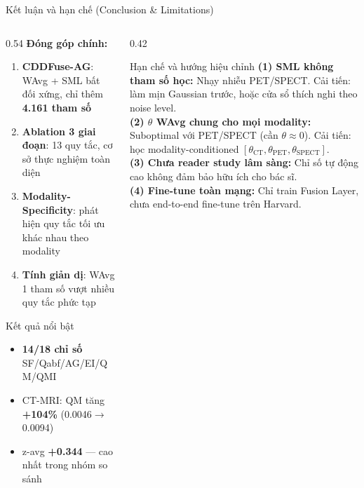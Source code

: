 \documentclass[t, aspectratio=169]{beamer}
\begin{document}
\begin{frame}{Kết luận và hạn chế (Conclusion \& Limitations)}
    \begin{columns}[T]
        \begin{column}{0.54\textwidth}
            \textbf{Đóng góp chính:}
            \begin{enumerate}\itemsep2pt\small
                \item \textbf{CDDFuse-AG}: WAvg + SML bất đối xứng, chỉ thêm \textbf{4.161 tham số}
                \item \textbf{Ablation 3 giai đoạn}: 13 quy tắc, cơ sở thực nghiệm toàn diện
                \item \textbf{Modality-Specificity}: phát hiện quy tắc tối ưu khác nhau theo modality
                \item \textbf{Tính giản dị}: WAvg 1 tham số vượt nhiều quy tắc phức tạp
            \end{enumerate}
            \vspace{0.3em}
            \begin{block}{\small Kết quả nổi bật}
                \small
                \begin{itemize}\itemsep1pt
                    \item \textbf{14/18 chỉ số} SF/Qabf/AG/EI/QM/QMI
                    \item CT-MRI: QM tăng \textbf{+104\%} (0.0046$\to$0.0094)
                    \item z-avg \textbf{+0.344} --- cao nhất trong nhóm so sánh
                \end{itemize}
            \end{block}
        \end{column}
        \begin{column}{0.42\textwidth}
            \begin{alertblock}{Hạn chế và hướng hiệu chỉnh}
                \small
                \textbf{(1) SML không tham số học:} Nhạy nhiễu PET/SPECT. Cải tiến: làm mịn Gaussian trước, hoặc cửa sổ thích nghi theo noise level.\\[4pt]
                \textbf{(2) $\theta$ WAvg chung cho mọi modality:} Suboptimal với PET/SPECT (cần $\theta\approx0$). Cải tiến: học modality-conditioned $[\theta_\text{CT},\theta_\text{PET},\theta_\text{SPECT}]$.\\[4pt]
                \textbf{(3) Chưa reader study lâm sàng:} Chỉ số tự động cao không đảm bảo hữu ích cho bác sĩ.\\[4pt]
                \textbf{(4) Fine-tune toàn mạng:} Chỉ train Fusion Layer, chưa end-to-end fine-tune trên Harvard.
            \end{alertblock}
        \end{column}
    \end{columns}
\end{frame}
\end{document}
